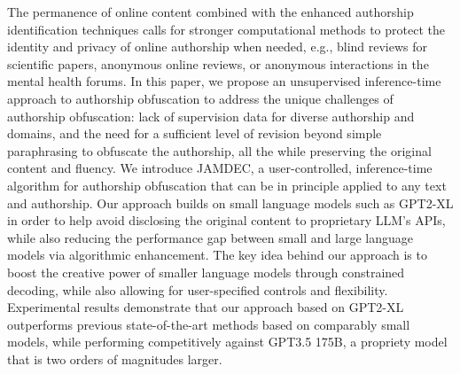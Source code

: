 The permanence of online content combined with the enhanced authorship identification techniques calls for stronger computational methods to protect the identity and privacy of online authorship when needed, e.g., blind reviews for scientific papers, anonymous online reviews, or anonymous interactions in the mental health forums. In this paper, we propose an unsupervised inference-time approach to authorship obfuscation to address the unique challenges of authorship obfuscation: lack of supervision data for diverse authorship and domains, and the need for a sufficient level of revision beyond simple paraphrasing to obfuscate the authorship, all the while preserving the original content and fluency. We introduce JAMDEC, a user-controlled, inference-time algorithm for authorship obfuscation that can be in principle applied to any text and authorship. Our approach builds on small language models such as GPT2-XL in order to help avoid disclosing the original content to proprietary LLM’s APIs, while also reducing the performance gap between small and large language models via algorithmic enhancement. The key idea behind our approach is to boost the creative power of smaller language models through constrained decoding, while also allowing for user-specified controls and flexibility. Experimental results demonstrate that our approach based on GPT2-XL outperforms previous state-of-the-art methods based on comparably small models, while performing competitively against GPT3.5 175B, a propriety model that is two orders of magnitudes larger.